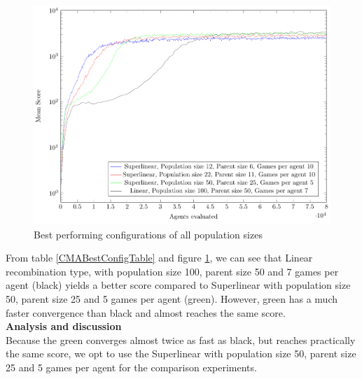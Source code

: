 \begin{figure}[H]
\centering
\includegraphics[scale=1]{data/cma_population_offspring/bestofall_population/PlotFile.pdf}
\caption{Best performing configurations of all population sizes \label{CMABestConfigPlot}}
\end{figure}

From table \ref{CMABestConfigTable} and figure \ref{CMABestConfigPlot}, we can see that
Linear recombination type, with population size 100, parent size 50 and 7 games per agent
(black) yields a better score compared to Superlinear with population size 50, parent size 25 and 5 games per agent (green).
However, green has a much faster convergence than black and almost reaches the same score.\\


\textbf{Analysis and discussion}\\
Because the green converges almost twice as fast as black, but reaches practically the same
score, we opt to use the Superlinear with population size 50, parent size 25 and 5 games per agent for the comparison experiments.









